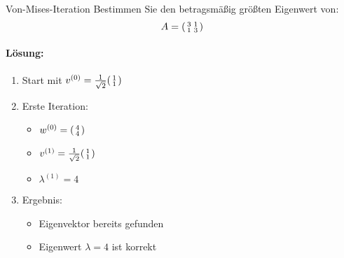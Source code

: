 \begin{example2}{Von-Mises-Iteration}
Bestimmen Sie den betragsmäßig größten Eigenwert von:
$$A = \begin{psmallmatrix}
3 & 1 \\
1 & 3
\end{psmallmatrix}$$

\paragraph{Lösung:}
\begin{enumerate}
    \item Start mit $v^{(0)} = \frac{1}{\sqrt{2}}\begin{psmallmatrix} 1 \\ 1 \end{psmallmatrix}$
    
    \item Erste Iteration:
    \begin{itemize}
        \item $w^{(0)} = \begin{psmallmatrix} 4 \\ 4 \end{psmallmatrix}$
        \item $v^{(1)} = \frac{1}{\sqrt{2}}\begin{psmallmatrix} 1 \\ 1 \end{psmallmatrix}$
        \item $\lambda^{(1)} = 4$
    \end{itemize}
    
    \item Ergebnis:
    \begin{itemize}
        \item Eigenvektor bereits gefunden
        \item Eigenwert $\lambda = 4$ ist korrekt
    \end{itemize}
\end{enumerate}
\end{example2}

